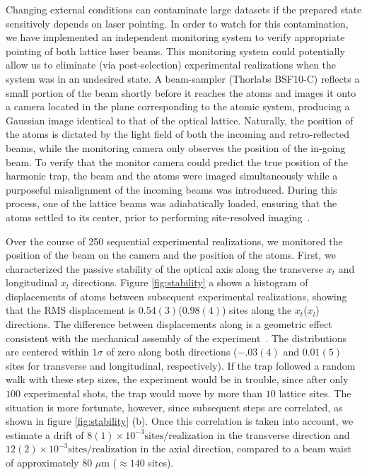 \documentclass[twocolumn,aps,pra,showpacs,preprintnumbers,bibnotes]{revtex4-1}
\begin{document}
Changing external conditions can contaminate large datasets if the prepared state sensitively depends on laser pointing. 
In order to watch for this contamination, we have implemented an independent monitoring system to verify appropriate pointing of both lattice laser beams.
This monitoring system could potentially allow us to eliminate (via post-selection) experimental realizations when the system was in an undesired state.
A beam-sampler (Thorlabs BSF10-C) reflects a small portion of the beam shortly before it reaches the atoms and images it onto a camera located in the plane corresponding to the atomic system, producing a Gaussian image identical to that of the optical lattice.
Naturally, the position of the atoms is dictated by the light field of both the incoming and retro-reflected beams, while the monitoring camera only observes the position of the in-going beam.
To verify that the monitor camera could predict the true position of the harmonic trap, the beam and the atoms were imaged simultaneously while a purposeful misalignment of the incoming beams was introduced.
During this process, one of the lattice beams was adiabatically loaded, ensuring that the atoms settled to its center, prior to performing site-resolved imaging~\cite{Parsons2015}.

Over the course of 250 sequential experimental realizations, we monitored the position of the beam on the camera and the position of the atoms. 
First, we characterized the passive stability of the optical axis along the transverse $x_t$ and longitudinal $x_l$ directions. 
Figure \ref{fig:stability} a shows a histogram of displacements of atoms between subsequent experimental realizations, showing that the RMS displacement is $0.54(3)$($0.98(4)$) sites along the $x_t$($x_l$) directions.
The difference between displacements along is a geometric effect consistent with the mechanical assembly of the experiment~\cite{Huber2014}.
The distributions are centered within $1\sigma$ of zero along both directions ($-.03(4)$ and $0.01(5)$ sites for transverse and longitudinal, respectively).
If the trap followed a random walk with these step sizes, the experiment would be in trouble, since after only $100$ experimental shots, the trap would move by more than $10$ lattice sites.
The situation is more fortunate, however, since subsequent steps are correlated, as shown in figure \ref{fig:stability} (b).
Once this correlation is taken into account, we estimate a drift of $8(1)\times 10^{-3}\mathrm{sites}/\mathrm{realization}$ in the transverse direction and $12(2)\times 10^{-3}\mathrm{sites}/\mathrm{realization}$ in the axial direction, compared to a beam waist of approximately $80$ $\mu$m ($\approx 140$ sites).
\end{document}
